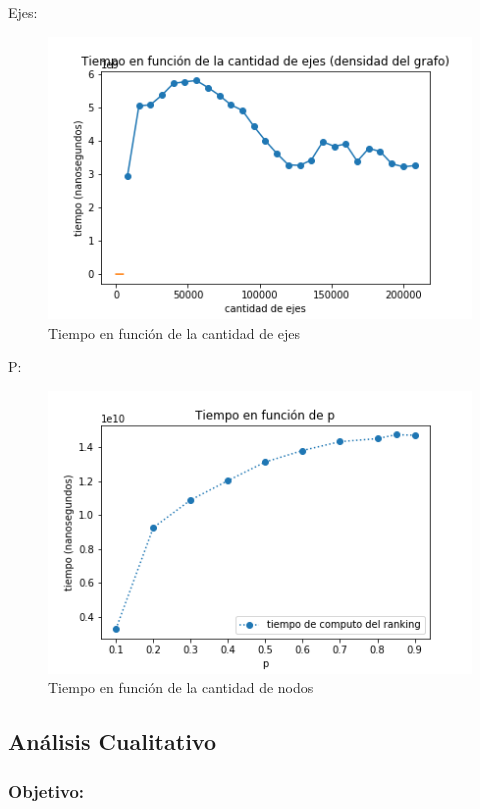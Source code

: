 Ejes:

\begin{figure}[h]
   \begin{center}
     \includegraphics{img/tiempo_ejes.png} 
  \end{center}
\caption{Tiempo en función de la cantidad de ejes} \label{fig:exp1-ejes}
\end{figure}

P:


\begin{figure}[h]
   \begin{center}
     \includegraphics{img/tiempo_p.png} 
  \end{center}
\caption{Tiempo en función de la cantidad de nodos} \label{fig:exp1-p}
\end{figure}


\subsection{Análisis Cualitativo}

\subsubsection{Objetivo:}

